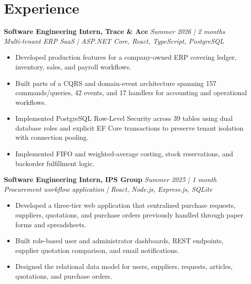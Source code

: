 \documentclass[10pt,a4paper]{article}
\begin{document}
\section{Experience}
\textbf{Software Engineering Intern, Trace \& Ace} \hfill \textit{Summer 2026 | 2 months}\\
\textit{Multi-tenant ERP SaaS | ASP.NET Core, React, TypeScript, PostgreSQL}
\begin{itemize}
  \item Developed production features for a company-owned ERP covering ledger, inventory, sales, and payroll workflows.
  \item Built parts of a CQRS and domain-event architecture spanning 157 commands/queries, 42 events, and 17 handlers for accounting and operational workflows.
  \item Implemented PostgreSQL Row-Level Security across 39 tables using dual database roles and explicit EF Core transactions to preserve tenant isolation with connection pooling.
  \item Implemented FIFO and weighted-average costing, stock reservations, and backorder fulfillment logic.
\end{itemize}

\textbf{Software Engineering Intern, IPS Group} \hfill \textit{Summer 2025 | 1 month}\\
\textit{Procurement workflow application | React, Node.js, Express.js, SQLite}
\begin{itemize}
  \item Developed a three-tier web application that centralized purchase requests, suppliers, quotations, and purchase orders previously handled through paper forms and spreadsheets.
  \item Built role-based user and administrator dashboards, REST endpoints, supplier quotation comparison, and email notifications.
  \item Designed the relational data model for users, suppliers, requests, articles, quotations, and purchase orders.
\end{itemize}
\end{document}
